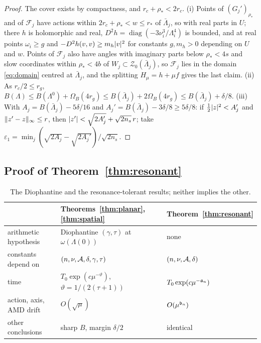 \begin{proof}
The cover exists by compactness, and $r_c+\rho_*<2r_c$. (i) Points of $(G_j')_{\rho_*}$ and of $\mathcal F_j$
have actions within $2r_c+\rho_*<w\le r_*$ of $\bar\Lambda_j$, so with real parts in $U$; there $h$ is
holomorphic and real, $D^2h=\operatorname{diag}(-3\nu_i^3/\Lambda_i^4)$ is bounded, and at real points
$\omega_i\ge g$ and $-D^2h(v,v)\ge m_h\lvert v\rvert^2$ for constants $g,m_h>0$ depending on $U$ and $w$. Points of
$\mathcal F_j$ also have angles with imaginary parts below $\rho_*<4s$ and slow coordinates within $\rho_*<4b$ of
$W_j\subset\mathcal Z_0(\bar\Lambda_j)$, so $\mathcal F_j$ lies in the domain \eqref{eq:domain} centred at
$\bar\Lambda_j$, and the splitting $H_\mu=h+\mu f$ gives the last claim. (ii) As $r_c/2\le r_g$,
$B(\Lambda)\le B(\Lambda^0)+\Omega_B(4r_g)\le B(\bar\Lambda_j)+2\Omega_B(4r_g)\le B(\bar\Lambda_j)+\delta/8$.
(iii) With $A_j=B(\bar\Lambda_j)-5\delta/16$ and $A_j'=B(\bar\Lambda_j)-3\delta/8\ge5\delta/8$: if
$\frac12\lvert z\rvert^2<A_j'$ and $\lVert z'-z\rVert_\infty\le r$, then $\lvert z'\rvert<\sqrt{2A_j'}+\sqrt{2n_s}\,r$; take
$\varepsilon_1=\min_j(\sqrt{2A_j}-\sqrt{2A_j'})/\sqrt{2n_s}$.
\end{proof}

\subsection{Proof of Theorem~\ref{thm:resonant}}

\begin{table}[ht]
\centering\small
\begin{tabular}{@{}lll@{}}
\toprule
 & Theorems~\ref{thm:planar}, \ref{thm:spatial} & Theorem~\ref{thm:resonant}\\
\midrule
arithmetic hypothesis & Diophantine $(\gamma,\tau)$ at $\omega(\Lambda(0))$ & none\\
constants depend on & $(n,\nu,\mathcal{A},\delta,\gamma,\tau)$ & $(n,\nu,\mathcal{A},\delta)$\\
time & $T_0\exp(c\mu^{-\vartheta})$, $\vartheta=1/(2(\tau+1))$ & $T_0\exp(c\mu^{-\mathfrak{a}_n{}})$\\
action, axis, AMD drift & $O(\sqrt\mu)$ & $O(\mu^{\mathfrak{b}_n{}})$\\
other conclusions & sharp $B$, margin $\delta/2$ & identical\\
\bottomrule
\end{tabular}
\caption{The Diophantine and the resonance-tolerant results; neither implies the other.}\label{tab:comparison}
\end{table}

